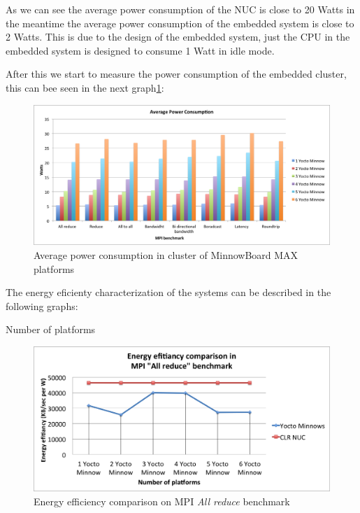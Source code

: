 As we can see the average power consumption of the NUC is close to 20 Watts in
the meantime the average power consumption of the embedded system is close to
2 Watts. This is due to the design of the embedded system, just the CPU in the
embedded system is designed to consume 1 Watt in idle mode.

After this we start to measure the power consumption of the embedded cluster,
this can bee seen in the next graph\ref{power_average_minnow}: 

\begin{figure}[H]
\centering
\includegraphics[width=1 \textwidth]{images/power_average.png}
\caption{Average power consumption in cluster of MinnowBoard MAX platforms}
\label{power_average_minnow}
\end{figure}


The energy eficienty characterization of the systems can be described in the
following graphs: 

Number of platforms

\begin{figure}[H]
\centering
\includegraphics[width=1 \textwidth]{images/energy_results/allreduce.png}
\caption{Energy efficiency comparison on MPI \textit{All reduce} benchmark}
\label{all_reduce_energy}
\end{figure}


